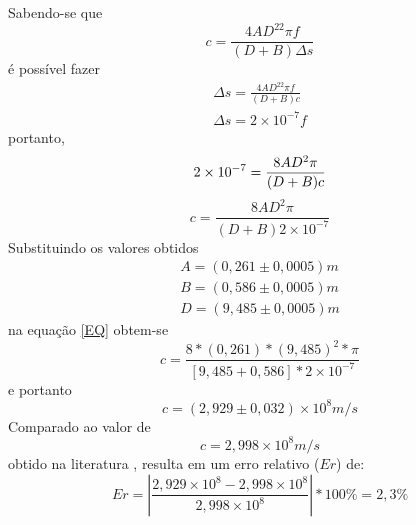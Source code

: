 Sabendo-se que
\begin{equation}
	c = \frac{4AD^22\pi f}{(D+B)\Delta s}
\end{equation}
é possível fazer
\begin{equation}
\begin{split}
	\Delta s = \frac{4AD^22\pi f}{(D+B)c}\\
	\Delta s = 2\times10^{-7}f
\end{split}
\end{equation}
portanto,
\begin{equation}
	2\times10^{-7}=\frac{8AD^2\pi}{(D+B)c}\\
\end{equation}
\begin{equation}
	c=\frac{8AD^2\pi}{(D+B)2\times10^{-7}}
\label{EQ}
\end{equation}
Substituindo os valores obtidos
\begin{equation}
	\begin{split}
		A = (0,261\pm0,0005)m\\
		B = (0,586\pm0,0005)m\\
		D = (9,485\pm0,0005)m
	\end{split}
\end{equation}
na equação \ref{EQ} obtem-se
\begin{equation}
	c=\frac{8*(0,261)*(9,485)^2*\pi}{[9,485+0,586]*2\times10^{-7}}
\end{equation}
e portanto
\begin{equation}
	c=(2,929\pm0,032)\times10^{8} m/s
\end{equation}
Comparado ao valor de 
\begin{equation}
	c=2,998\times10^{8} m/s
\end{equation}        
obtido na literatura \cite{PASCO}, resulta em um erro relativo ($Er$) de:
\begin{equation}
	Er=|\frac{2,929\times10^{8}-2,998\times10^{8}}{2,998\times10^{8}}|*100\%= 2,3\%
\end{equation}
